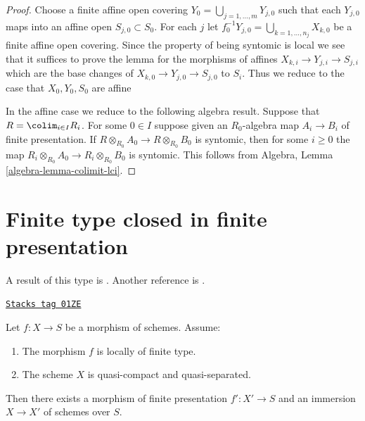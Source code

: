 \begin{proof}
Choose a finite affine open covering
$Y_0 = \bigcup_{j = 1, \ldots, m} Y_{j, 0}$
such that each $Y_{j, 0}$ maps into an affine open
$S_{j, 0} \subset S_0$. For each $j$ let
$f_0^{-1}Y_{j, 0} = \bigcup_{k = 1, \ldots, n_j} X_{k, 0}$ be a
finite affine open covering. Since the property of being syntomic is
local we see that it suffices to prove the lemma for the morphisms
of affines $X_{k, i} \to Y_{j, i} \to S_{j, i}$ which are the base
changes of $X_{k, 0} \to Y_{j, 0} \to S_{j, 0}$ to $S_i$.
Thus we reduce to the case that $X_0, Y_0, S_0$ are affine

\medskip\noindent
In the affine case we reduce to the following algebra result.
Suppose that $R = \colim_{i \in I} R_i$. For some $0 \in I$
suppose given an $R_0$-algebra map $A_i \to B_i$ of finite presentation.
If $R \otimes_{R_0} A_0 \to R \otimes_{R_0} B_0$ is syntomic, then
for some $i \geq 0$ the map
$R_i \otimes_{R_0} A_0 \to R_i \otimes_{R_0} B_0$ is syntomic.
This follows from Algebra,
Lemma \ref{algebra-lemma-colimit-lci}.
\end{proof}

\section{Finite type closed in finite presentation}
\label{limits-section-finite-type-closed-in-finite-presentation}
A result of this type is \cite[Satz 2.10]{Kiehl}. Another
reference is \cite{Conrad-Nagata}.

\begin{lemma}
\label{limits-lemma-locally-finite-type-in-finite-presentation}
\href{https://stacks.math.columbia.edu/tag/01ZE}{\texttt{Stacks tag 01ZE}}

Let $f : X \to S$ be a morphism of schemes.
Assume:
\begin{enumerate}
\item The morphism $f$ is locally of finite type.
\item The scheme $X$ is quasi-compact and quasi-separated.
\end{enumerate}
Then there exists a morphism of finite presentation
$f' : X' \to S$ and an immersion $X \to X'$ of schemes over $S$.
\end{lemma}

